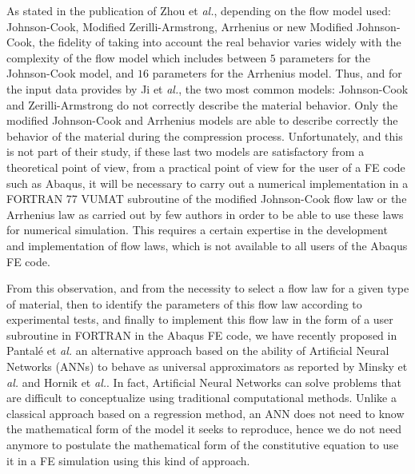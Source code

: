 \documentclass[algorithms,article,submit,pdftex,moreauthors]{Definitions/mdpi}
\makeatletter
\DeclareRobustCommand{\eal}{et \emph{al.}\@\xspace}
\makeatother
\begin{document}
As stated in the publication of Zhou \eal \cite{Zhou-2020}, depending on the flow model used: Johnson-Cook, Modified Zerilli-Armstrong, Arrhenius or new Modified Johnson-Cook, the fidelity of taking into account the real behavior varies widely with the complexity of the flow model which includes between $5$ parameters for the Johnson-Cook model, and $16$ parameters for the Arrhenius model.
Thus, and for the input data provides by Ji \eal \cite{Ji-2018}, the two most common models: Johnson-Cook and Zerilli-Armstrong do not correctly describe the material behavior.
Only the modified Johnson-Cook and Arrhenius models are able to describe correctly the behavior of the material during the compression process.
Unfortunately, and this is not part of their study, if these last two models are satisfactory from a theoretical point of view, from a practical point of view for the user of a FE code such as Abaqus, it will be necessary to carry out a numerical implementation in a FORTRAN 77 VUMAT subroutine of the modified Johnson-Cook flow law or the Arrhenius law as carried out by few authors \cite{Liang-2022, Gao-2007-FRT, Ming-2018} in order to be able to use these laws for numerical simulation.
This requires a certain expertise in the development and implementation of flow laws, which is not available to all users of the Abaqus FE code.

From this observation, and from the necessity to select a flow law for a given type of material, then to identify the parameters of this flow law according to experimental tests, and finally to implement this flow law in the form of a user subroutine in FORTRAN in the Abaqus FE code, we have recently proposed in Pantalé \eal \cite{Pantale-2021} an alternative approach based on the ability of Artificial Neural Networks (ANNs) to behave as universal approximators as reported by Minsky \eal \cite{Minsky-1969} and Hornik \eal \cite{Hornik-1989}.
In fact, Artificial Neural Networks can solve problems that are difficult to conceptualize using traditional computational methods.
Unlike a classical approach based on a regression method, an ANN does not need to know the mathematical form of the model it seeks to reproduce, hence we do not need anymore to postulate the mathematical form of the constitutive equation to use it in a FE simulation using this kind of approach.
\end{document}
